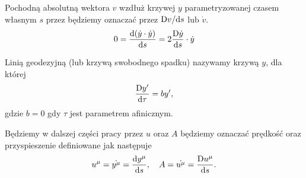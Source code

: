 Pochodną absolutną wektora $v$ wzdłuż krzywej $y$
parametryzowanej czasem własnym $s$
przez będziemy oznaczać przez $\text{D} v/\text{d} s$ lub $\dot{v}$. 
\begin{align*}
0 = \frac{\text{d} (\dot{y} \cdot \dot{y}) }{\text{d} s} = 
2 \frac{\text{D} \dot{y}}{\text{d} s} \cdot \dot{y}
\end{align*}
\begin{definition}
Linią geodezyjną (lub krzywą swobodnego spadku) nazywamy 
krzywą $y$, dla której
\begin{align*}
\frac{\text{D} y'}{\text{d} \tau } = b y',
\end{align*} 
gdzie $b=0$ gdy $\tau$ jest parametrem afinicznym.
\end{definition}
Będziemy w dalszej części pracy przez $u$ oraz $A$ będziemy oznaczać
prędkość oraz przyspieszenie definiowane jak następuje
\begin{align*}
u^\mu = \dot{y^\mu} = \frac{\text{d} y^\mu}{\text{d} s}, 
\quad A = \dot{u^\mu} =  \frac{\text{D} u^\mu}{\text{d} s}.
\end{align*}




